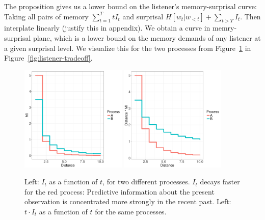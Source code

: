 The proposition gives us a lower bound on the listener's memory-surprisal curve: Taking all pairs of memory $\sum_{t=1}^T t I_t$ and surprisal $H[w_t|w_{<t}] + \sum_{t > T} I_t$.
Then interplate linearly (justify this in appendix).
We obtain a curve in memry-surprisal plane, which is a lower bound on the memory demands of any listener at a given surprisal level.
We visualize this for the two processes from Figure~\ref{fig:basic} in Figure~\ref{fig:listener-tradeoff}.


\begin{figure}
\includegraphics[width=0.45\textwidth]{toy/decay.pdf}
\includegraphics[width=0.45\textwidth]{toy/memory.pdf}
%
	\caption{Left: $I_t$ as a function of $t$, for two different processes. $I_t$ decays faster for the red process: Predictive information about the present observation is concentrated more strongly in the recent past. Left: $t \cdot I_t$ as a function of $t$ for the same processes. }\label{fig:basic}
\end{figure}



